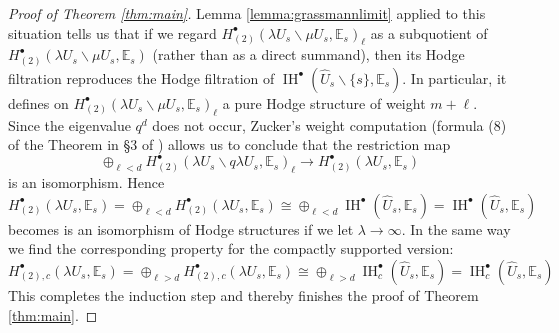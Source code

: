 \documentclass[12pt,letterpaper]{amsart}
\numberwithin{equation}{section}
\def\EE{{\mathbb E}}
\def\ssm{\smallsetminus}
\def\pt{{\scriptscriptstyle\bullet}}
\newcommand\IH{\operatorname{IH}}
\theoremstyle{remark}
\begin{document}
\begin{proof}[Proof of Theorem \ref{thm:main}]
Lemma \ref{lemma:grassmannlimit} applied to this situation tells us  that if we regard $H_{(2)}^\pt(\lambda  U_s\ssm \mu U_s, \EE_s )_\ell$
as a subquotient of  $H_{(2)}^\pt(\lambda  U_s\ssm \mu U_s, \EE_s)$ (rather than as a direct summand), then its  Hodge filtration reproduces the Hodge filtration of $\IH^\pt(\hat U_s\ssm \{s\}, \EE_s)$. In particular, it defines on 
$H_{(2)}^\pt(\lambda  U_s\ssm \mu U_s, \EE_s )_\ell$ a pure Hodge structure of weight $m+\ell$.
Since  the eigenvalue $q^d$ does not occur, Zucker's weight  computation (formula (8) of the Theorem in \S 3 of \cite{zucker:l2_ii}) allows us to conclude that the restriction map
\[
\oplus_{\ell <d} H_{(2)}^\pt(\lambda U_s\ssm q\lambda U_s, \EE_s )_\ell\to H_{(2)}^\pt(\lambda U_s, \EE_s )
\]
is an isomorphism. Hence 
\[
H_{(2)}^\pt(\lambda  U_s, \EE_s )=\oplus_{\ell <d} H_{(2)}^\pt(\lambda  U_s, \EE_s )\cong 
\oplus_{\ell <d}\IH^\pt(\hat U_s, \EE_s)=\IH^\pt(\hat U_s, \EE_s)
\]
becomes  is an isomorphism of Hodge structures if we let $\lambda\to \infty$.
In the same way we find the corresponding  property for the compactly supported version:
\[
H_{(2),c}^\pt(\lambda  U_s, \EE_s )=\oplus_{\ell >d} H_{(2),c}^\pt(\lambda  U_s, \EE_s )\cong 
\oplus_{\ell >d}\IH_c^\pt(\hat U_s, \EE_s)=\IH_c^\pt(\hat U_s, \EE_s)
\]
This completes the induction step and thereby finishes the proof of Theorem \ref{thm:main}.
\end{proof}
\end{document}
